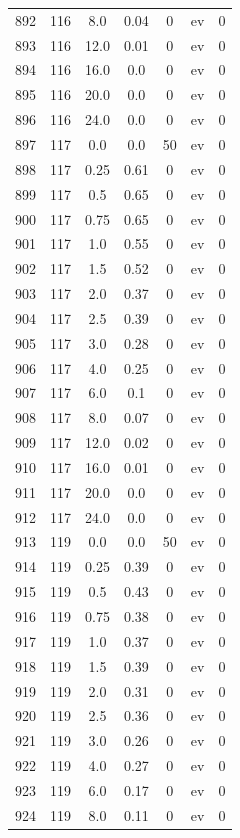 \documentclass[12pt,a4paper]{article}
\begin{document}
\begin{tabular}{r|cccccc}
	892 & 116 & 8.0 & 0.04 & 0 & ev & 0 \\
	893 & 116 & 12.0 & 0.01 & 0 & ev & 0 \\
	894 & 116 & 16.0 & 0.0 & 0 & ev & 0 \\
	895 & 116 & 20.0 & 0.0 & 0 & ev & 0 \\
	896 & 116 & 24.0 & 0.0 & 0 & ev & 0 \\
	897 & 117 & 0.0 & 0.0 & 50 & ev & 0 \\
	898 & 117 & 0.25 & 0.61 & 0 & ev & 0 \\
	899 & 117 & 0.5 & 0.65 & 0 & ev & 0 \\
	900 & 117 & 0.75 & 0.65 & 0 & ev & 0 \\
	901 & 117 & 1.0 & 0.55 & 0 & ev & 0 \\
	902 & 117 & 1.5 & 0.52 & 0 & ev & 0 \\
	903 & 117 & 2.0 & 0.37 & 0 & ev & 0 \\
	904 & 117 & 2.5 & 0.39 & 0 & ev & 0 \\
	905 & 117 & 3.0 & 0.28 & 0 & ev & 0 \\
	906 & 117 & 4.0 & 0.25 & 0 & ev & 0 \\
	907 & 117 & 6.0 & 0.1 & 0 & ev & 0 \\
	908 & 117 & 8.0 & 0.07 & 0 & ev & 0 \\
	909 & 117 & 12.0 & 0.02 & 0 & ev & 0 \\
	910 & 117 & 16.0 & 0.01 & 0 & ev & 0 \\
	911 & 117 & 20.0 & 0.0 & 0 & ev & 0 \\
	912 & 117 & 24.0 & 0.0 & 0 & ev & 0 \\
	913 & 119 & 0.0 & 0.0 & 50 & ev & 0 \\
	914 & 119 & 0.25 & 0.39 & 0 & ev & 0 \\
	915 & 119 & 0.5 & 0.43 & 0 & ev & 0 \\
	916 & 119 & 0.75 & 0.38 & 0 & ev & 0 \\
	917 & 119 & 1.0 & 0.37 & 0 & ev & 0 \\
	918 & 119 & 1.5 & 0.39 & 0 & ev & 0 \\
	919 & 119 & 2.0 & 0.31 & 0 & ev & 0 \\
	920 & 119 & 2.5 & 0.36 & 0 & ev & 0 \\
	921 & 119 & 3.0 & 0.26 & 0 & ev & 0 \\
	922 & 119 & 4.0 & 0.27 & 0 & ev & 0 \\
	923 & 119 & 6.0 & 0.17 & 0 & ev & 0 \\
	924 & 119 & 8.0 & 0.11 & 0 & ev & 0 \\

\end{tabular}
\end{document}
